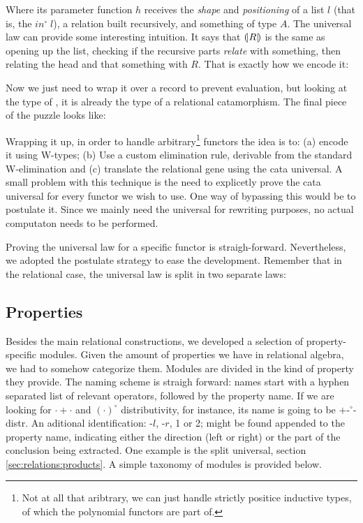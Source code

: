 
Where its parameter function $h$ receives the \emph{shape} and \emph{positioning} of a list $l$
(that is, the $in^\circ\;l$), a relation built recursively, and something of type $A$.
The universal law can provide some interesting intuition. It says that $\mathopen{(\!|}R\mathclose{|\!)}$ is
the same as opening up the list, checking if the recursive parts \emph{relate} with something,
then relating the head and that something with $R$. That is exactly how we encode it:


Now we just need to wrap it over a record to prevent evaluation, but looking at the type
of , it is already the type of a relational catamorphism. The final piece of the puzzle looks like:


Wrapping it up, in order to handle arbitrary\footnote{
Not at all that aribtrary, we can just handle strictly positice inductive types, of which
the polynomial functors are part of.
} functors the idea is to: (a) encode it using W-types; (b) Use a custom elimination rule, derivable
from the standard W-elimination and (c) translate the relational gene using the cata universal. 
A small problem with this technique is the need to explicetly prove the cata universal for
every functor we wish to use. One way of bypassing this would be to postulate it. Since
we mainly need the universal for rewriting purposes, no actual computaton needs to be performed.

Proving the universal law for a specific functor is straigh-forward. Nevertheless, we adopted
the postulate strategy to ease the development. Remember that in the relational case, the universal
law is split in two separate laws:



\subsection{Properties}

Besides the main relational constructions, we developed a selection of property-specific modules.
Given the amount of properties we have in relational algebra, we had to somehow categorize them.
Modules are divided in the kind of property they provide. The naming scheme is straigh forward:
names start with a hyphen separated list of relevant operators, followed by the property name.
If we are looking for $\cdot + \cdot$ and $(\cdot)^\circ$ distributivity, for instance, 
its name is going to be $+$-$^\circ$-distr. An aditional identification: -$l$, -$r$, 1 or 2; might be found
appended to the property name, indicating either the direction (left or right) or the part of 
the conclusion being extracted. One example is the split universal, section \ref{sec:relations:products}.
A simple taxonomy of modules is provided below.

